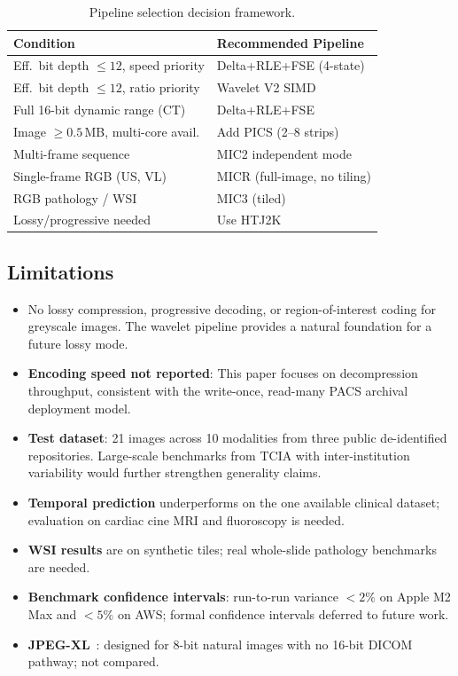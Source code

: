\documentclass[10pt,twocolumn]{article}
\begin{document}
\begin{table}[h]
  \centering
  \caption{Pipeline selection decision framework.}
  \label{tab:heuristic}
  \small
  \begin{tabular}{p{3.5cm}p{3.5cm}}
    \toprule
    Condition & Recommended Pipeline \\
    \midrule
    Eff.\ bit depth $\leq 12$, speed priority  & Delta+RLE+FSE (4-state) \\
    Eff.\ bit depth $\leq 12$, ratio priority  & Wavelet V2 SIMD \\
    Full 16-bit dynamic range (CT)             & Delta+RLE+FSE \\
    Image $\geq 0.5$\,MB, multi-core avail.   & Add PICS (2--8 strips) \\
    Multi-frame sequence                       & MIC2 independent mode \\
    Single-frame RGB (US, VL)                  & MICR (full-image, no tiling) \\
    RGB pathology / WSI                        & MIC3 (tiled) \\
    Lossy/progressive needed                   & Use HTJ2K \\
    \bottomrule
  \end{tabular}
\end{table}

\subsection{Limitations}

\begin{itemize}
  \item No lossy compression, progressive decoding, or region-of-interest coding for greyscale images. The wavelet pipeline provides a natural foundation for a future lossy mode.
  \item \textbf{Encoding speed not reported}: This paper focuses on decompression throughput, consistent with the write-once, read-many PACS archival deployment model.
  \item \textbf{Test dataset}: 21 images across 10 modalities from three public de-identified repositories. Large-scale benchmarks from TCIA with inter-institution variability would further strengthen generality claims.
  \item \textbf{Temporal prediction} underperforms on the one available clinical dataset; evaluation on cardiac cine MRI and fluoroscopy is needed.
  \item \textbf{WSI results} are on synthetic tiles; real whole-slide pathology benchmarks are needed.
  \item \textbf{Benchmark confidence intervals}: run-to-run variance $<2\%$ on Apple M2 Max and $<5\%$ on AWS; formal confidence intervals deferred to future work.
  \item \textbf{JPEG-XL}~\cite{jpegxl}: designed for 8-bit natural images with no 16-bit DICOM pathway; not compared.
\end{itemize}
\end{document}
